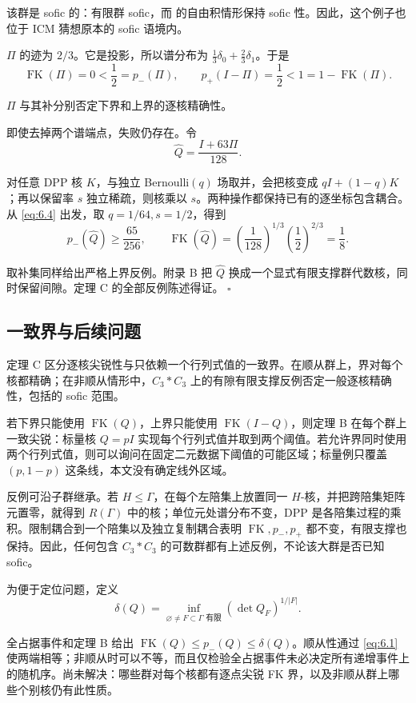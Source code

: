 \documentclass[UTF8,zihao=-4,a4paper]{ctexart}
\numberwithin{equation}{section}
\begin{document}
该群是 sofic 的：有限群 sofic，而 \cite[Theorem 1]{ES} 的自由积情形保持 sofic 性。因此，这个例子也位于 ICM 猜想原本的 sofic 语境内。

\(\Pi\) 的迹为 \(2/3\)。它是投影，所以谱分布为
\(\frac13\delta_0+\frac23\delta_1\)。于是
\[
\operatorname{FK}(\Pi)=0<\frac12=p_-(\Pi),\qquad
p_+(I-\Pi)=\frac12<1=1-\operatorname{FK}(\Pi).
\tag{6.8}\label{eq:6.9}
\]

\(\Pi\) 与其补分别否定下界和上界的逐核精确性。

即使去掉两个谱端点，失败仍存在。令
\[
\widehat Q=\frac{I+63\Pi}{128}.
\]

对任意 DPP 核 \(K\)，与独立 Bernoulli\((q)\) 场取并，会把核变成
\(qI+(1-q)K\)；再以保留率 \(s\) 独立稀疏，则核乘以 \(s\)。两种操作都保持已有的逐坐标包含耦合。从 \eqref{eq:6.4} 出发，取
\(q=1/64,s=1/2\)，得到
\[
p_-(\widehat Q)\ge\frac{65}{256},\qquad
\operatorname{FK}(\widehat Q)
=\left(\frac1{128}\right)^{1/3}
 \left(\frac12\right)^{2/3}
=\frac18.
\tag{6.9}\label{eq:6.10}
\]

取补集同样给出严格上界反例。附录 B 把 \(\widehat Q\) 换成一个显式有限支撑群代数核，同时保留间隙。定理 C 的全部反例陈述得证。 \(\square\)

\subsection{一致界与后续问题}

定理 C 区分逐核尖锐性与只依赖一个行列式值的一致界。在顺从群上，界对每个核都精确；在非顺从情形中，$C_3*C_3$ 上的有隙有限支撑反例否定一般逐核精确性，包括\cite[Conjecture~5.7]{ICM}的 sofic 范围。

若下界只能使用 \(\operatorname{FK}(Q)\)，上界只能使用
\(\operatorname{FK}(I-Q)\)，则定理 B 在每个群上一致尖锐：标量核 \(Q=pI\) 实现每个行列式值并取到两个阈值。若允许界同时使用两个行列式值，则可以询问在固定二元数据下阈值的可能区域；标量例只覆盖 \((p,1-p)\) 这条线，本文没有确定线外区域。

反例可沿子群继承。若 \(H\le\Gamma\)，在每个左陪集上放置同一 \(H\)-核，并把跨陪集矩阵元置零，就得到 \(R(\Gamma)\) 中的核；单位元处谱分布不变，DPP 是各陪集过程的乘积。限制耦合到一个陪集以及独立复制耦合表明
\(\operatorname{FK},p_-,p_+\) 都不变，有限支撑也保持。因此，任何包含 \(C_3*C_3\) 的可数群都有上述反例，不论该大群是否已知 sofic。

为便于定位问题，定义
\[
\delta(Q)=\inf_{\varnothing\ne F\subset\Gamma\text{ 有限}}
                (\det Q_F)^{1/|F|}.
\]

全占据事件和定理 B 给出
\(\operatorname{FK}(Q)\le p_-(Q)\le\delta(Q)\)。顺从性通过 \eqref{eq:6.1} 使两端相等；非顺从时可以不等，而且仅检验全占据事件未必决定所有递增事件上的随机序。尚未解决：哪些群对每个核都有逐点尖锐 FK 界，以及非顺从群上哪些个别核仍有此性质。
\end{document}
